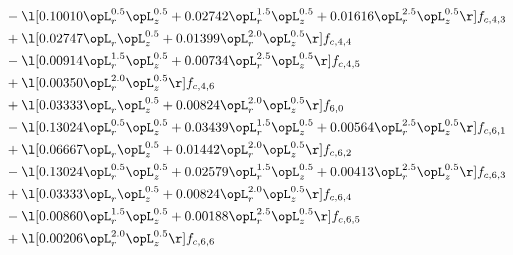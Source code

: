 \begin{alignat}{2}
& - \l[  0.10010 \opL_r^{0.5} \opL_z^{0.5} +  0.02742 \opL_r^{1.5} \opL_z^{0.5} +  0.01616 \opL_r^{2.5} \opL_z^{0.5}  \r] f_{c,4,3} \nonumber \\ 
& + \l[  0.02747 \opL_r \opL_z^{0.5} +  0.01399 \opL_r^{2.0} \opL_z^{0.5}  \r] f_{c,4,4} \nonumber \\ 
& - \l[  0.00914 \opL_r^{1.5} \opL_z^{0.5} +  0.00734 \opL_r^{2.5} \opL_z^{0.5}  \r] f_{c,4,5} \nonumber \\ 
& + \l[  0.00350 \opL_r^{2.0} \opL_z^{0.5}  \r] f_{c,4,6} \nonumber \\ 
& + \l[  0.03333 \opL_r \opL_z^{0.5} +  0.00824 \opL_r^{2.0} \opL_z^{0.5}  \r] f_{6,0} \nonumber \\ 
& - \l[  0.13024 \opL_r^{0.5} \opL_z^{0.5} +  0.03439 \opL_r^{1.5} \opL_z^{0.5} +  0.00564 \opL_r^{2.5} \opL_z^{0.5}  \r] f_{c,6,1} \nonumber \\ 
& + \l[  0.06667 \opL_r \opL_z^{0.5} +  0.01442 \opL_r^{2.0} \opL_z^{0.5}  \r] f_{c,6,2} \nonumber \\ 
& - \l[  0.13024 \opL_r^{0.5} \opL_z^{0.5} +  0.02579 \opL_r^{1.5} \opL_z^{0.5} +  0.00413 \opL_r^{2.5} \opL_z^{0.5}  \r] f_{c,6,3} \nonumber \\ 
& + \l[  0.03333 \opL_r \opL_z^{0.5} +  0.00824 \opL_r^{2.0} \opL_z^{0.5}  \r] f_{c,6,4} \nonumber \\ 
& - \l[  0.00860 \opL_r^{1.5} \opL_z^{0.5} +  0.00188 \opL_r^{2.5} \opL_z^{0.5}  \r] f_{c,6,5} \nonumber \\ 
& + \l[  0.00206 \opL_r^{2.0} \opL_z^{0.5}  \r] f_{c,6,6} \nonumber \\ 
\end{alignat} 


